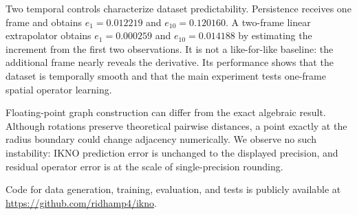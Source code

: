\documentclass[mlmain]{jmlr}
\newcommand{\IKNO}{\textsc{IKNO}}
\begin{document}
Two temporal controls characterize dataset predictability. Persistence receives
one frame and obtains $e_1=0.012219$ and $e_{10}=0.120160$. A two-frame linear
extrapolator obtains $e_1=0.000259$ and $e_{10}=0.014188$ by estimating the
increment from the first two observations. It is not a like-for-like baseline:
the additional frame nearly reveals the derivative. Its performance shows that
the dataset is temporally smooth and that the main experiment tests one-frame
spatial operator learning.

Floating-point graph construction can differ from the exact algebraic result.
Although rotations preserve theoretical pairwise distances, a point exactly at
the radius boundary could change adjacency numerically. We observe no such
instability: \IKNO{} prediction error is unchanged to the displayed precision,
and residual operator error is at the scale of single-precision rounding.

Code for data generation, training, evaluation, and tests is publicly available
at \url{https://github.com/ridhamp4/ikno}.
\end{document}
